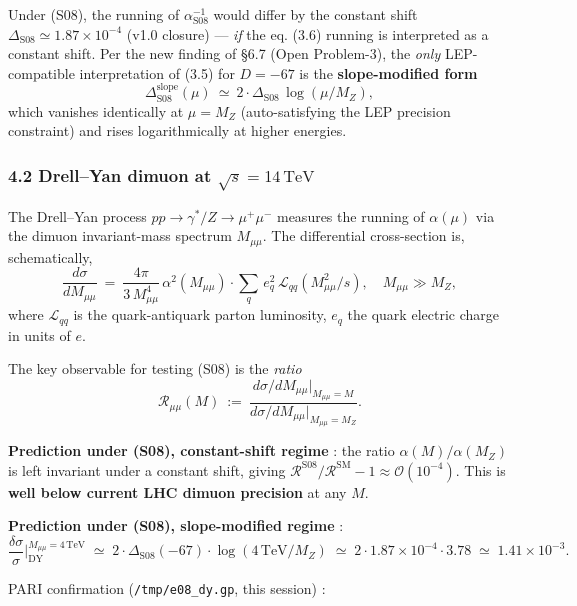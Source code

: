 \documentclass[
  11pt,
  a4paper,
]{article}
\begin{document}
Under (S08), the running of \(\alpha^{-1}_{\mathrm{S08}}\) would differ by the constant shift \(\Delta_{\mathrm{S08}} \simeq 1.87 \times 10^{-4}\) (v1.0 closure) --- \emph{if} the eq. (3.6) running is interpreted as a constant shift. Per the new finding of §6.7 (Open Problem-3), the \emph{only} LEP-compatible interpretation of (3.5) for \(D = -67\) is the \textbf{slope-modified form}
\[
\Delta_{\mathrm{S08}}^{\mathrm{slope}}(\mu)\ \simeq\ 2 \cdot \Delta_{\mathrm{S08}}\,\log(\mu/M_Z),
\]
which vanishes identically at \(\mu = M_Z\) (auto-satisfying the LEP precision constraint) and rises logarithmically at higher energies.

\hypertarget{drellyan-dimuon-at-sqrt-s-14mathrmtev}{%
\subsubsection{\texorpdfstring{4.2 Drell--Yan dimuon at \(\sqrt s = 14\,\mathrm{TeV}\)}{4.2 Drell--Yan dimuon at \textbackslash sqrt s = 14\textbackslash,\textbackslash mathrm\{TeV\}}}\label{drellyan-dimuon-at-sqrt-s-14mathrmtev}}

The Drell--Yan process \(pp \to \gamma^*/Z \to \mu^+\mu^-\) measures the running of \(\alpha(\mu)\) via the dimuon invariant-mass spectrum \(M_{\mu\mu}\). The differential cross-section is, schematically,
\[
\frac{d\sigma}{dM_{\mu\mu}}\ =\ \frac{4\pi}{3\,M_{\mu\mu}^4}\,\alpha^2(M_{\mu\mu})\cdot \sum_q\,e_q^2\,\mathcal L_{qq}(M_{\mu\mu}^2/s),\quad
M_{\mu\mu} \gg M_Z,
\]
where \(\mathcal L_{qq}\) is the quark-antiquark parton luminosity, \(e_q\) the quark electric charge in units of \(e\).

The key observable for testing (S08) is the \emph{ratio}
\[
\mathcal R_{\mu\mu}(M)\ :=\ \frac{d\sigma/dM_{\mu\mu}|_{M_{\mu\mu} = M}}{d\sigma/dM_{\mu\mu}|_{M_{\mu\mu} = M_Z}}.
\]

\textbf{Prediction under (S08), constant-shift regime} : the ratio \(\alpha(M)/\alpha(M_Z)\) is left invariant under a constant shift, giving \(\mathcal R^{\mathrm{S08}}/\mathcal R^{\mathrm{SM}} - 1 \approx \mathcal O(10^{-4})\). This is \textbf{well below current LHC dimuon precision} at any \(M\).

\textbf{Prediction under (S08), slope-modified regime} :
\[
\frac{\delta \sigma}{\sigma}\bigg|_{\mathrm{DY}}^{M_{\mu\mu} = 4\,\mathrm{TeV}} \;\simeq\; 2 \cdot \Delta_{\mathrm{S08}}(-67) \cdot \log(4\,\mathrm{TeV}/M_Z) \;\simeq\; 2 \cdot 1.87 \times 10^{-4} \cdot 3.78 \;\simeq\; 1.41 \times 10^{-3}.
\]

PARI confirmation (\texttt{/tmp/e08\_dy.gp}, this session) :
\end{document}
